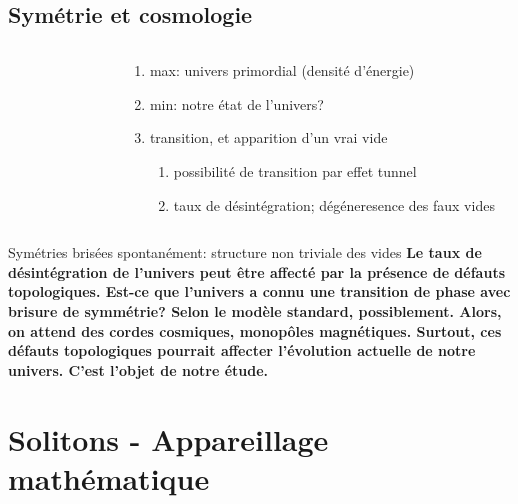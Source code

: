 \documentclass[handout]{beamer}
\begin{document}
\subsection{Symétrie et cosmologie}
\begin{frame}

\begin{columns}
    \begin{column}{.5\linewidth}
   \begin{figure}[0.3\textwidth]
    \end{figure}
    \end{column}
    \begin{column}{.5\linewidth}
    \begin{enumerate}
    \item max: univers primordial (densité d'énergie)
    \item min: notre état de l'univers?
    \item transition, et apparition d'un vrai vide
    \begin{enumerate}
    \item possibilité de transition par effet tunnel
    \item taux de désintégration; dégéneresence des faux vides
    \end{enumerate}
    \end{enumerate}
    \end{column}
  \end{columns}
  \end{frame}
  
  \begin{frame}
    Symétries brisées spontanément: structure non triviale des vides
    \textbf{Le taux de désintégration de l'univers peut être affecté par la présence de défauts topologiques. Est-ce que l'univers a connu une transition de phase avec brisure de symmétrie? Selon le modèle standard, possiblement. Alors, on attend des cordes cosmiques, monopôles magnétiques. Surtout, ces défauts topologiques pourrait affecter l'évolution actuelle de notre univers. C'est l'objet de notre étude.}
    
  \end{frame}


\section{Solitons - Appareillage mathématique }
\end{document}
